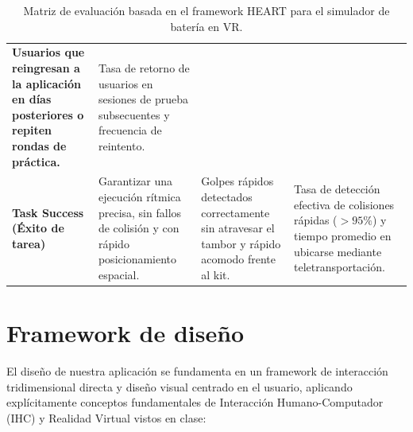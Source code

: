 \documentclass{article}
\begin{document}
\begin{table}[H]
\begin{tabular}{@{} >{\bfseries}p{} >{\raggedright\arraybackslash}p{} >{\raggedright\arraybackslash}p{} >{\raggedright\arraybackslash}p{} @{}}
Usuarios que reingresan a la aplicación en días posteriores o repiten rondas de práctica. &
Tasa de retorno de usuarios en sesiones de prueba subsecuentes y frecuencia de reintento. \\
\addlinespace[0.4em]
Task Success \newline \normalfont\footnotesize(Éxito de tarea) &
Garantizar una ejecución rítmica precisa, sin fallos de colisión y con rápido posicionamiento espacial. &
Golpes rápidos detectados correctamente sin atravesar el tambor y rápido acomodo frente al kit. &
Tasa de detección efectiva de colisiones rápidas ($>95\%$) y tiempo promedio en ubicarse mediante teletransportación. \\
\bottomrule
\end{tabular}
\caption{\label{tab:heart}Matriz de evaluación basada en el framework HEART para el simulador de batería en VR.}
\end{table}

\section{Framework de diseño}

El diseño de nuestra aplicación se fundamenta en un framework de interacción tridimensional directa y diseño visual centrado en el usuario, aplicando explícitamente conceptos fundamentales de Interacción Humano-Computador (IHC) y Realidad Virtual vistos en clase:
\end{document}
